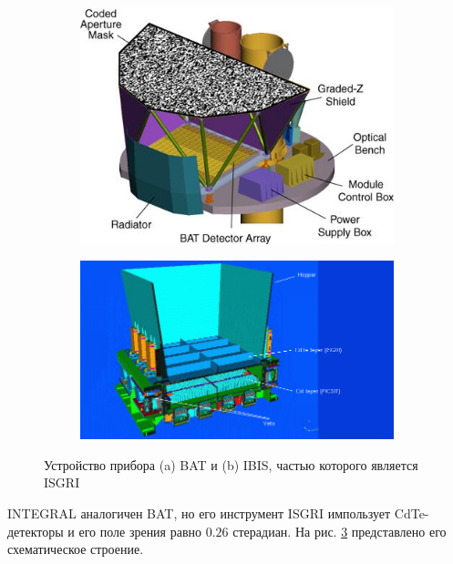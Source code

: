	\begin{figure}[h!]
		\centering
			\begin{subfigure}[b]{0.49\linewidth}
			\includegraphics[width = \textwidth]{pictures/BAT.jpg}
			\caption{}
			\label{img:bat1}
		\end{subfigure}
		\begin{subfigure}[b]{0.49\linewidth}
		\centering
			\includegraphics[width = \textwidth]{pictures/INTEGRAL.png}
			\caption{}
			\label{img:int1}
		\end{subfigure}
		\caption{Устройство прибора (a) BAT и (b) IBIS, частью которого является ISGRI}
	\end{figure}
	
	INTEGRAL аналогичен BAT, но его инструмент ISGRI импользует CdTe-детекторы и его поле зрения равно $0.26$ стерадиан. На рис. \ref{img:int1} представлено его схематическое строение. 
